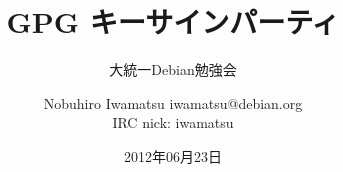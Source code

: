 




\documentclass[cjk,dvipdfmx,12pt]{beamer}
\usepackage{monthlypresentation}



\title{GPG キーサインパーティ}
\subtitle{大統一Debian勉強会}
\author{Nobuhiro Iwamatsu iwamatsu@debian.org\\IRC nick: iwamatsu}
\date{2012年06月23日}




